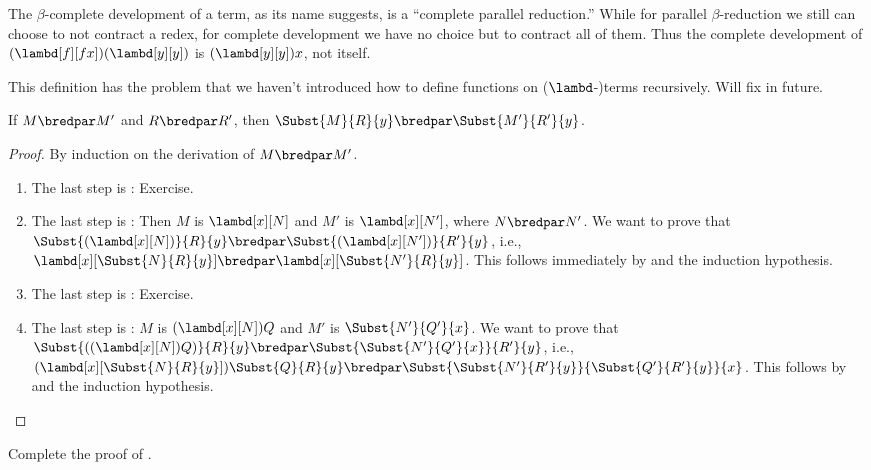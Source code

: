 \documentclass[../../../include/open-logic-section]{subfiles}
\begin{document}
The $\beta$-complete development of a term, as its name suggests, is a
``complete parallel reduction.'' While for parallel $\beta$-reduction we still
can choose to not contract a redex, for complete development we have
no choice but to contract all of them. Thus the complete development
of $(\lambd[f][fx])(\lambd[y][y])$ is $(\lambd[y][y])x$, not itself.

\begin{editorial}
  This definition has the problem that we haven't introduced how to
  define functions on ($\lambd$-)terms recursively. Will fix in future.
\end{editorial}

\begin{lem}
  If $M \bredpar M'$ and $R \bredpar R'$, then $\Subst{M}{R}{y}
  \bredpar \Subst{M'}{R'}{y}$.
\end{lem}

\begin{proof}
  By induction on the derivation of $M \bredpar M'$.
  \begin{enumerate}
    \item The last step is : Exercise.
    \item The last step is : Then $M$ is 
      $\lambd[x][N]$ and $M'$ is $\lambd[x][N']$,
      where $N \bredpar N'$. We want to prove that
      $\Subst{(\lambd[x][N])}{R}{y} \bredpar
      \Subst{(\lambd[x][N'])}{R'}{y}$, i.e.,
      $\lambd[x][\Subst{N}{R}{y}] \bredpar
      \lambd[x][\Subst{N'}{R}{y}]$. This follows immediately by
       and the induction hypothesis.
    \item The last step is : Exercise.
    \item The last step is : $M$ is
      $(\lambd[x][N])Q$ and $M'$ is $\Subst{N'}{Q'}{x}$. We want to
      prove that $\Subst{((\lambd[x][N])Q)}{R}{y} \bredpar
      \Subst{\Subst{N'}{Q'}{x}}{R'}{y}$, i.e.,
      $(\lambd[x][\Subst{N}{R}{y}])\Subst{Q}{R}{y} \bredpar
      \Subst{\Subst{N'}{R'}{y}}{\Subst{Q'}{R'}{y}}{x}$. This follows
      by  and the induction hypothesis.
  \end{enumerate}
\end{proof}

\begin{prob}
  Complete the proof of .
\end{prob}
\end{document}
